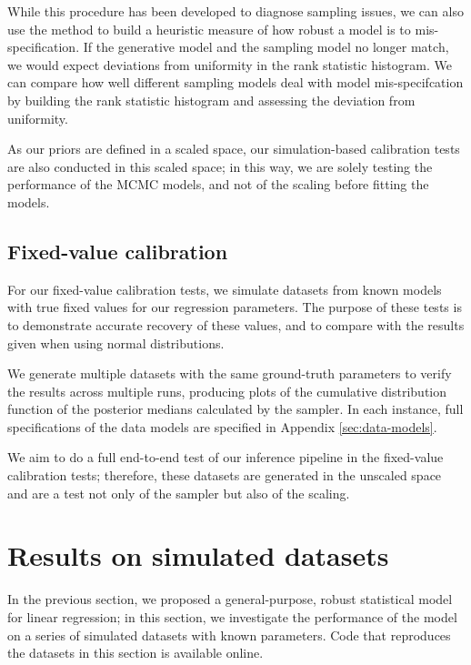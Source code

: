 \documentclass[fleqn,usenatbib]{rasti}
\begin{document}
While this procedure has been developed to diagnose sampling issues, we can also
use the method to build a heuristic measure of how robust a model is to
mis-specification. If the generative model and the sampling model no longer
match, we would expect deviations from uniformity in the rank statistic
histogram. We can compare how well different sampling models deal with model
mis-specifcation by building the rank statistic histogram and assessing the
deviation from uniformity.

As our priors are defined in a scaled space, our simulation-based calibration
tests are also conducted in this scaled space; in this way, we are solely
testing the performance of the MCMC models, and not of the scaling before
fitting the models.

\subsection{Fixed-value calibration}
\label{sec:methods.fixed}

For our fixed-value calibration tests, we simulate datasets from known models
with true fixed values for our regression parameters. The purpose of these tests
is to demonstrate accurate recovery of these values, and to compare with the
results given when using normal distributions.

We generate multiple datasets with the same ground-truth parameters to verify
the results across multiple runs, producing plots of the cumulative distribution
function of the posterior medians calculated by the sampler. In each instance,
full specifications of the data models are specified in Appendix
\ref{sec:data-models}.

We aim to do a full end-to-end test of our inference pipeline in the fixed-value
calibration tests; therefore, these datasets are generated in the unscaled space
and are a test not only of the sampler but also of the scaling.

\section{Results on simulated datasets}
\label{sec:results}

In the previous section, we proposed a general-purpose, robust statistical model
for linear regression; in this section, we investigate the performance of the
model on a series of simulated datasets with known parameters. Code that
reproduces the datasets in this section is available online\footnotemark.
\end{document}
